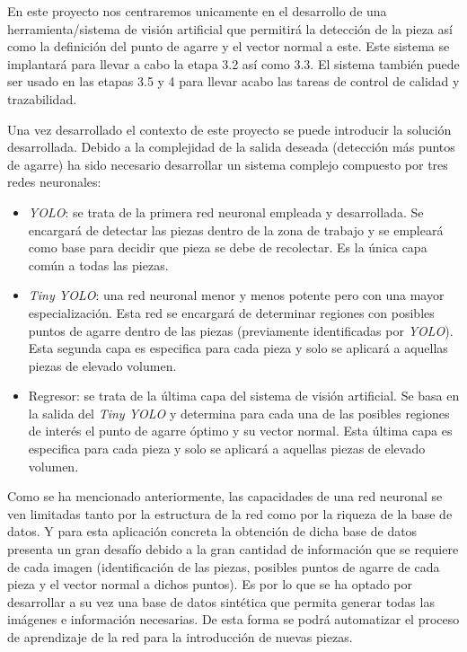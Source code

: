 En este proyecto nos centraremos unicamente en el desarrollo de una herramienta/sistema de visión artificial que permitirá la detección de la pieza así como la definición del punto de agarre y el vector normal a este. Este sistema se implantará para llevar a cabo la etapa 3.2 así como 3.3. El sistema también puede ser usado en las etapas 3.5 y 4 para llevar acabo las tareas de control de calidad y trazabilidad.

Una vez desarrollado el contexto de este proyecto se puede introducir la solución desarrollada. Debido a la complejidad de la salida deseada (detección más puntos de agarre) ha sido necesario desarrollar un sistema complejo compuesto por tres redes neuronales:

\begin{itemize}
\item \textit{YOLO}: se trata de la primera red neuronal empleada y desarrollada. Se encargará de detectar las piezas dentro de la zona de trabajo y se empleará como base para decidir que pieza se debe de recolectar. Es la única capa común a todas las piezas.

\item \textit{Tiny YOLO}: una red neuronal menor y menos potente pero con una mayor especialización. Esta red se encargará de determinar regiones con posibles puntos de agarre dentro de las piezas (previamente identificadas por \textit{YOLO}). Esta segunda capa es especifica para cada pieza y solo se aplicará a aquellas piezas de elevado volumen.

\item Regresor: se trata de la última capa del sistema de visión artificial. Se basa en la salida del \textit{Tiny YOLO} y determina para cada una de las posibles regiones de interés el punto de agarre óptimo y su vector normal. Esta última capa es especifica para cada pieza y solo se aplicará a aquellas piezas de elevado volumen.
\end{itemize}

Como se ha mencionado anteriormente, las capacidades de una red neuronal se ven limitadas tanto por la estructura de la red como por la riqueza de la base de datos. Y para esta aplicación concreta la obtención de dicha base de datos presenta un gran desafío debido a la gran cantidad de información que se requiere de cada imagen (identificación de las piezas, posibles puntos de agarre de cada pieza y el vector normal a dichos puntos). Es por lo que se ha optado por desarrollar a su vez una base de datos sintética que permita generar todas las imágenes e información necesarias. De esta forma se podrá automatizar el proceso de aprendizaje de la red para la introducción de nuevas piezas.